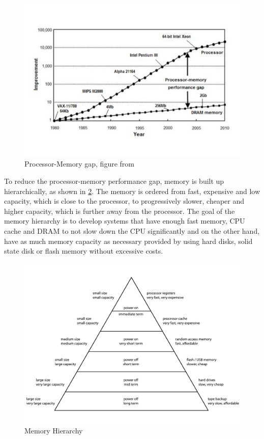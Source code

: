 \documentclass[
	12pt,
	a4paper,
	abstract,
	bibliography=totoc,
	chapterprefix,
	headings=openright,
	numbers=endperiod,
	parskip=half,
	twoside,
]{scrreprt}
\begin{document}
\begin{figure}[ht]
	\centering
	\includegraphics[scale=0.45]{processor_memory_gap.pdf}
	\caption{Processor-Memory gap, figure from \cite{cpu-mem-gap}}
		\label{fig:processor memory gap}
\end{figure}


To reduce the processor-memory performance gap, memory is built up hierarchically, as shown in \cref{fig:memory hierarchy}.
The memory is ordered from fast, expensive and low capacity, which is close to the processor, to progressively slower, cheaper and higher capacity, which is further away from the processor.
The goal of the memory hierarchy is to develop systems that have enough fast memory, CPU cache and DRAM to not slow down the CPU significantly and on the other hand, have as much memory capacity as necessary provided by using hard disks, solid state disk or flash memory without excessive costs.

\begin{figure}[ht]
	\centering
	\includegraphics[scale=0.6]{ComputerMemoryHierarchy.pdf}
	\caption{Memory Hierarchy}
		\label{fig:memory hierarchy}
\end{figure}
\end{document}
